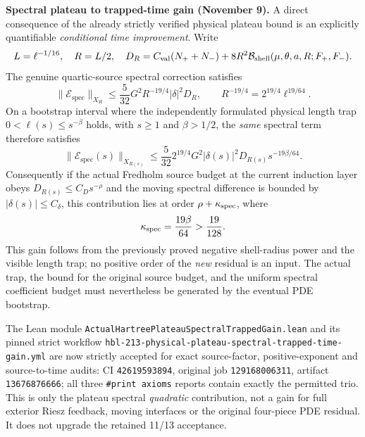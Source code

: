 \documentclass[11pt]{amsart}
\begin{document}
\medskip
\noindent\textbf{Spectral plateau to trapped-time gain (November 9).}
A direct consequence of the already strictly verified physical plateau bound
is an explicitly quantifiable \emph{conditional time improvement}.  Write
\[
L=\ell^{-1/16},\quad R=L/2,\quad
D_R=C_{\rm val}(N_++N_-)
    +8R^2\mathcal B_{\rm shell}(\mu,\theta,a,R;F_+,F_-).
\]
The genuine quartic-source spectral correction satisfies
\[
\|\mathcal E_{\mathrm{spec}}\|_{X_R}
\le \frac5{32}G^2R^{-19/4}|\delta|^2D_R,\qquad
R^{-19/4}=2^{19/4}\ell^{19/64}.
\]
On a bootstrap interval where the independently formulated physical
length trap $0<\ell(s)\le s^{-\beta}$ holds, with $s\ge1$ and
$\beta>1/2$, the \emph{same} spectral term therefore satisfies
\[
\|\mathcal E_{\mathrm{spec}}(s)\|_{X_{R(s)}}
\le \frac5{32}2^{19/4}G^2|\delta(s)|^2
  D_{R(s)}s^{-19\beta/64}.
\]
Consequently if the actual Fredholm source budget at the current
induction layer obeys
$D_{R(s)}\le C_Ds^{-\rho}$ and the moving spectral difference is
bounded by $|\delta(s)|\le C_\delta$, this contribution lies at
order $\rho+\kappa_{\rm spec}$, where
\[
\kappa_{\rm spec}=\frac{19\beta}{64}>\frac{19}{128}.
\]
This gain follows from the previously proved negative shell-radius
power and the visible length trap; no positive order of the
\emph{new} residual is an input.  The actual trap, the bound for the
original source budget, and the uniform spectral coefficient budget
must nevertheless be generated by the eventual PDE bootstrap.

The Lean module
\texttt{ActualHartreePlateauSpectralTrappedGain.lean} and its pinned
strict workflow \texttt{hbl-213-physical-plateau-spectral-trapped-time-gain.yml}
are now strictly accepted for exact source-factor, positive-exponent
and source-to-time audits: CI \texttt{42619593894}, original job
\texttt{129168006311}, artifact \texttt{13676876666}; all three
\texttt{\#print axioms} reports contain exactly the permitted trio.  This is only the plateau spectral
\emph{quadratic} contribution, not a gain for full exterior Riesz
feedback, moving interfaces or the original four-piece PDE residual.
It does not upgrade the retained 11/13 acceptance.
\end{document}
